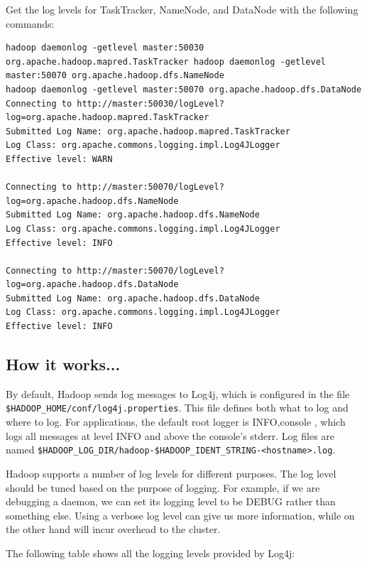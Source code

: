 Get the log levels for TaskTracker, NameNode, and DataNode with the following commands:
\begin{verbatim}
hadoop daemonlog -getlevel master:50030 org.apache.hadoop.mapred.TaskTracker hadoop daemonlog -getlevel master:50070 org.apache.hadoop.dfs.NameNode
hadoop daemonlog -getlevel master:50070 org.apache.hadoop.dfs.DataNode
Connecting to http://master:50030/logLevel?log=org.apache.hadoop.mapred.TaskTracker
Submitted Log Name: org.apache.hadoop.mapred.TaskTracker
Log Class: org.apache.commons.logging.impl.Log4JLogger
Effective level: WARN

Connecting to http://master:50070/logLevel?log=org.apache.hadoop.dfs.NameNode
Submitted Log Name: org.apache.hadoop.dfs.NameNode
Log Class: org.apache.commons.logging.impl.Log4JLogger
Effective level: INFO

Connecting to http://master:50070/logLevel?log=org.apache.hadoop.dfs.DataNode
Submitted Log Name: org.apache.hadoop.dfs.DataNode
Log Class: org.apache.commons.logging.impl.Log4JLogger
Effective level: INFO
\end{verbatim}

\subsection*{How it works...}
By default, Hadoop sends log messages to Log4j, which is configured in the file \verb|$HADOOP_HOME/conf/log4j.properties|. This file defines both what to log and where to log. For applications, the default root logger is INFO,console , which logs all messages at level INFO and above the console's stderr. Log files are named \verb|$HADOOP_LOG_DIR/hadoop-$HADOOP_IDENT_STRING-<hostname>.log|.

Hadoop supports a number of log levels for different purposes. The log level should be tuned based on the purpose of logging. For example, if we are debugging a daemon, we can set its logging level to be DEBUG rather than something else. Using a verbose log level can give us more information, while on the other hand will incur overhead to the cluster.

The following table shows all the logging levels provided by Log4j: \\

